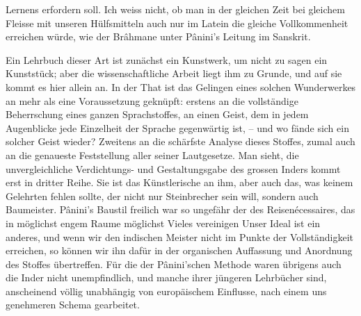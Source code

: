 Lernens erfordern soll. Ich weiss nicht, ob man in der gleichen Zeit bei gleichem Fleisse mit unseren Hülfsmitteln auch nur im Latein die gleiche Vollkommenheit erreichen würde, wie der Brâhmane unter Pânini’s Leitung im Sanskrit.

Ein Lehrbuch dieser Art ist zunächst ein Kunstwerk, um nicht zu sagen ein Kunststück; aber die wissenschaftliche Arbeit liegt ihm zu Grunde, und auf sie kommt es hier allein an. In der That ist das Gelingen eines solchen Wunderwerkes an mehr als eine Voraussetzung geknüpft: erstens an die vollständige Beherrschung eines ganzen Sprachstoffes, an einen Geist, dem in jedem Augenblicke jede Einzelheit der Sprache gegenwärtig ist, – und wo fände sich ein solcher Geist wieder? \label{fp.23} Zweitens an die schärfste Analyse dieses Stoffes, zumal auch an die genaueste Feststellung aller seiner Lautgesetze. Man sieht, die unvergleichliche Verdichtungs- und Gestaltungsgabe des grossen Inders kommt erst in dritter Reihe. Sie ist das Künstlerische an ihm, aber auch das, was keinem Gelehrten fehlen sollte, der nicht nur Steinbrecher sein will, sondern auch Baumeister. Pânini’s Baustil freilich war so ungefähr der des Reisenécessaires, das in möglichst engem Raume möglichst Vieles vereinigen  Unser Ideal ist ein anderes, und wenn wir den indischen Meister nicht im Punkte der Vollständigkeit erreichen, so können wir ihn dafür in der organischen Auffassung und Anordnung des Stoffes übertreffen. Für die  der Pânini’schen Methode waren übrigens auch die Inder nicht unempfindlich, und manche ihrer jüngeren Lehrbücher sind, anscheinend völlig unabhängig von europäischem Einflusse, nach einem uns genehmeren Schema gearbeitet.

\label{sp.24}

